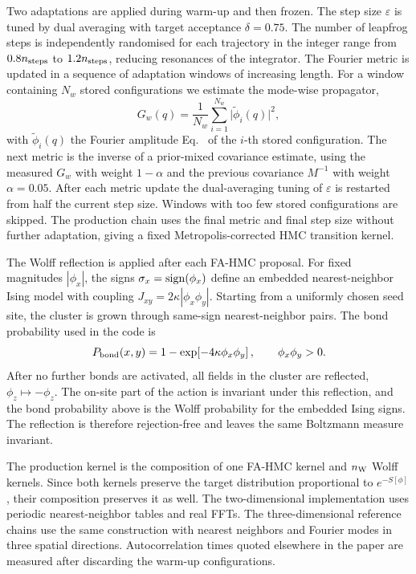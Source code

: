 \documentclass[reprint,twocolumn,superscriptaddress,preprintnumbers,amsmath,amssymb,aps,prd,floatfix]{revtex4-2}
\def\Eq#1{Eq.~\labelcref{#1}} \def\Eqs#1{Eqs.~\labelcref{#1}}
\begin{document}
Two adaptations are applied during warm-up and then frozen.  The step size $\varepsilon$ is tuned by dual averaging with target acceptance $\delta=0.75$.  The number of leapfrog steps is independently randomised for each trajectory in the integer range from $0.8n_{\rm steps}$ to $1.2n_{\rm steps}$, reducing resonances of the integrator.  The Fourier metric is updated in a sequence of adaptation windows of increasing length.  For a window containing $N_w$ stored configurations we estimate the mode-wise propagator,
\begin{equation}
G_w(q)=\frac{1}{N_w}\sum_{i=1}^{N_w}\bigl|\widetilde\phi_i(q)\bigr|^2,
\label{eq:fahmc_window_propagator}
\end{equation}
with $\widetilde\phi_i(q)$ the Fourier amplitude \Eq{eq:fourier_field} of the $i$-th stored configuration.  The next metric is the inverse of a prior-mixed covariance estimate, using the measured $G_w$ with weight $1-\alpha$ and the previous covariance $M^{-1}$ with weight $\alpha=0.05$.  After each metric update the dual-averaging tuning of $\varepsilon$ is restarted from half the current step size.  Windows with too few stored configurations are skipped.  The production chain uses the final metric and final step size without further adaptation, giving a fixed Metropolis-corrected HMC transition kernel.

The Wolff reflection is applied after each FA-HMC proposal.  For fixed magnitudes $|\phi_x|$, the signs $\sigma_x={\rm sign}(\phi_x)$ define an embedded nearest-neighbor Ising model with coupling $J_{xy}=2\kappa |\phi_x\phi_y|$.  Starting from a uniformly chosen seed site, the cluster is grown through same-sign nearest-neighbor pairs.  The bond probability used in the code is
\begin{equation}
P_{\rm bond}(x,y)=1-\exp\!\left[-4\kappa\phi_x\phi_y\right],
\qquad \phi_x\phi_y>0 .
\end{equation}
After no further bonds are activated, all fields in the cluster are reflected, $\phi_z\mapsto-\phi_z$.  The on-site part of the action is invariant under this reflection, and the bond probability above is the Wolff probability for the embedded Ising signs.  The reflection is therefore rejection-free and leaves the same Boltzmann measure invariant.

The production kernel is the composition of one FA-HMC kernel and $n_{\rm W}$ Wolff kernels.  Since both kernels preserve the target distribution proportional to $e^{-S[\phi]}$, their composition preserves it as well.  The two-dimensional implementation uses periodic nearest-neighbor tables and real FFTs.  The three-dimensional reference chains use the same construction with nearest neighbors and Fourier modes in three spatial directions.  Autocorrelation times quoted elsewhere in the paper are measured after discarding the warm-up configurations.
\end{document}

